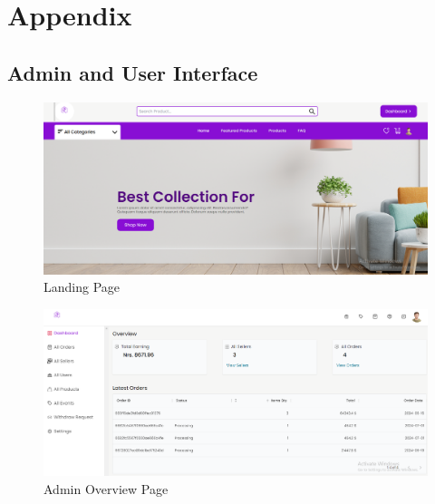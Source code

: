 \documentclass[12pt, a4paper, oneside]{article}
\begin{document}
\break


\section{Appendix}


\subsection*{ Admin and User Interface}

\begin{figure}[H]
\captionsetup{list=false}
\includegraphics[width=\linewidth ]{landing_page}
\centering
\caption{Landing Page}
\end{figure}

\begin{figure}[H]
\captionsetup{list=false}
\includegraphics[width=\linewidth ]{admin_main}
\centering
\caption{Admin Overview Page}
\label{fig:admin_main}
\end{figure}
\end{document}

